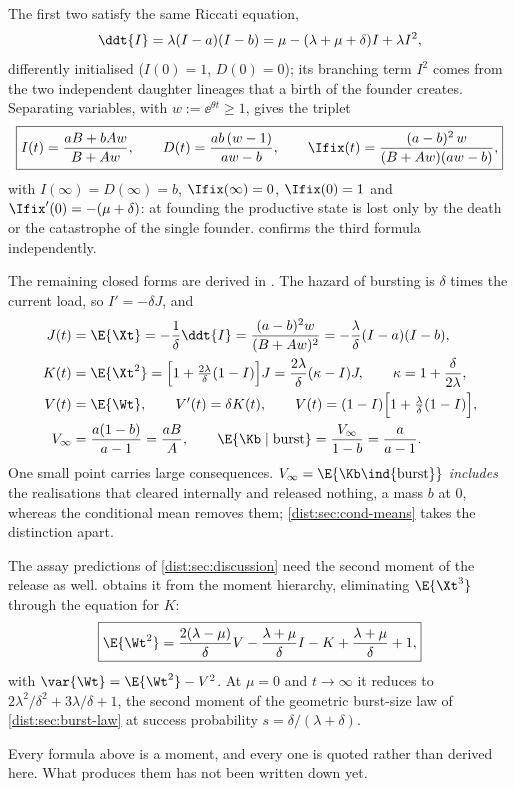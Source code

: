 The first two satisfy the same Riccati equation,
\begin{equation}
\ddt{I}=\lambda(I-a)(I-b)=\mu-(\lambda+\mu+\delta)I+\lambda I^2,
\label{dist:eq:riccati}
\end{equation}
differently initialised ($I(0)=1$, $D(0)=0$); its branching term $I^2$ comes
from the two independent daughter lineages that a birth of the founder
creates.
Separating variables, with $w:=\ee^{\theta t}\ge1$, gives the triplet
\begin{equation}
\boxed{I(t)=\frac{aB+bAw}{B+Aw},\qquad
D(t)=\frac{ab\,(w-1)}{aw-b},\qquad
\Ifix(t)=\frac{(a-b)^2\,w}{(B+Aw)(aw-b)},}
\label{dist:eq:idihat}
\end{equation}
with $I(\infty)=D(\infty)=b$, $\Ifix(\infty)=0$, $\Ifix(0)=1$ and
$\Ifix'(0)=-(\mu+\delta)$: at founding the productive state is lost only by
the death or the catastrophe of the single founder. 
confirms the third formula independently.

The remaining closed forms are derived in \ChCore. The hazard of bursting is
$\delta$ times the current load, so $I'=-\delta J$, and
\begin{align}
J(t)&=\E{\Xt}=-\frac1\delta\ddt{I}=\frac{(a-b)^2w}{(B+Aw)^2}
=-\frac{\lambda}{\delta}(I-a)(I-b),
\label{dist:eq:j}\\
K(t)&=\E{\Xt^2}=\Bigl[1+\tfrac{2\lambda}{\delta}(1-I)\Bigr]J
=\frac{2\lambda}{\delta}(\kappa-I)J,\qquad \kappa=1+\frac{\delta}{2\lambda},
\label{dist:eq:k}\\
V(t)&=\E{\Wt},\qquad V'(t)=\delta K(t),\qquad
V(t)=(1-I)\Bigl[1+\tfrac{\lambda}{\delta}(1-I)\Bigr],
\label{dist:eq:v}\\
V_\infty&=\frac{a(1-b)}{a-1}=\frac{aB}{A},
\qquad
\E{\Kb\mid\text{burst}}=\frac{V_\infty}{1-b}=\frac{a}{a-1}.
\label{dist:eq:vinf}
\end{align}
One small point carries large consequences.
$V_\infty=\E{\Kb\ind\{\text{burst}\}}$ \emph{includes} the realisations that
cleared internally and released nothing, a mass $b$ at $0$, whereas the
conditional mean removes them; \cref{dist:sec:cond-means} takes the
distinction apart.

The assay predictions of \cref{dist:sec:discussion} need the second moment of
the release as well. \ChCorecap{} obtains it from the moment hierarchy,
eliminating $\E{\Xt^3}$ through the equation for $K$:
\begin{equation}
\boxed{\E{\Wt^2}
=\frac{2(\lambda-\mu)}{\delta}V
-\frac{\lambda+\mu}{\delta}I
-K
+\frac{\lambda+\mu}{\delta}
+1,}
\label{dist:eq:ew2}
\end{equation}
with $\var{\Wt}=\E{\Wt^2}-V^2$. At $\mu=0$ and $t\to\infty$ it reduces to
$2\lambda^2/\delta^2+3\lambda/\delta+1$, the second moment of the geometric
burst-size law of \cref{dist:sec:burst-law} at success probability
$s=\delta/(\lambda+\delta)$.

Every formula above is a moment, and every one is quoted rather than derived
here. What produces them has not been written down yet.
